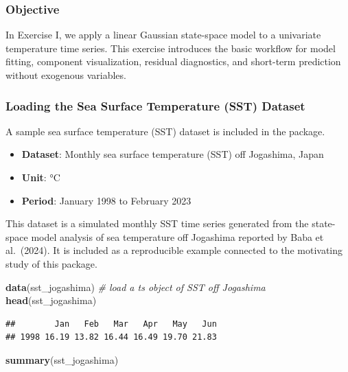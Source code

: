 \documentclass[
]{article}
\newenvironment{Shaded}{\begin{snugshade}}{\end{snugshade}}
\newcommand{\CommentTok}[1]{\textcolor[rgb]{0.56,0.35,0.01}{\textit{#1}}}
\newcommand{\FunctionTok}[1]{\textcolor[rgb]{0.13,0.29,0.53}{\textbf{#1}}}
\newcommand{\NormalTok}[1]{#1}
\providecommand{\tightlist}{%
  \setlength{\itemsep}{0pt}\setlength{\parskip}{0pt}}
\begin{document}
\subsubsection{Objective}\label{objective}

In Exercise I, we apply a linear Gaussian state-space model to a
univariate temperature time series. This exercise introduces the basic
workflow for model fitting, component visualization, residual
diagnostics, and short-term prediction without exogenous variables.

\subsubsection{Loading the Sea Surface Temperature (SST)
Dataset}\label{loading-the-sea-surface-temperature-sst-dataset}

A sample sea surface temperature (SST) dataset is included in the
package.

\begin{itemize}
\tightlist
\item
  \textbf{Dataset}: Monthly sea surface temperature (SST) off Jogashima,
  Japan\\
\item
  \textbf{Unit}: °C\\
\item
  \textbf{Period}: January 1998 to February 2023
\end{itemize}

This dataset is a simulated monthly SST time series generated from the
state-space model analysis of sea temperature off Jogashima reported by
Baba et al.~(2024). It is included as a reproducible example connected
to the motivating study of this package.

\begin{Shaded}
\begin{Highlighting}[]
\FunctionTok{data}\NormalTok{(sst\_jogashima) }\CommentTok{\# load a ts object of SST off Jogashima}
\FunctionTok{head}\NormalTok{(sst\_jogashima)}
\end{Highlighting}
\end{Shaded}

\begin{verbatim}
##        Jan   Feb   Mar   Apr   May   Jun
## 1998 16.19 13.82 16.44 16.49 19.70 21.83
\end{verbatim}

\begin{Shaded}
\begin{Highlighting}[]
\FunctionTok{summary}\NormalTok{(sst\_jogashima)}
\end{Highlighting}
\end{Shaded}
\end{document}

